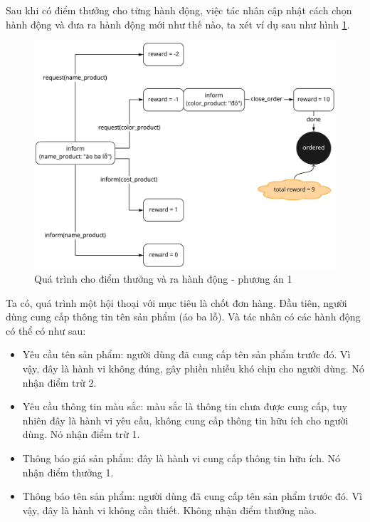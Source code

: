 Sau khi có điểm thưởng cho từng hành động, việc tác nhân cập nhật
cách chọn hành động và đưa ra hành động mới như thế nào, ta xét
ví dụ sau như hình \ref{fig:dialog2}.

\begin{figure}[!ht]
    \centering
    \includegraphics[scale=0.18]{thesis/chatbot/kienthuc/img/dialog_ex13.jpg}
    \caption{Quá trình cho điểm thưởng và ra hành động - phương án 1}
    \label{fig:dialog2}
\end{figure}

Ta có, quá trình một hội thoại với mục tiêu là chốt đơn hàng.
Đầu tiên, người dùng cung cấp thông tin tên sản phẩm (áo ba lỗ).
Và tác nhân có các hành động có thể có như sau:

\begin{itemize}
    \item Yêu cầu tên sản phẩm: người dùng đã cung cấp tên sản phẩm
    trước đó. Vì vậy, đây là hành vi không đúng, gây phiền nhiễu
    khó chịu cho người dùng. Nó nhận điểm trừ 2.
    \item Yêu cầu thông tin màu sắc: màu sắc là thông tin chưa được
    cung cấp, tuy nhiên đây là hành vi yêu cầu, không cung cấp
    thông tin hữu ích cho người dùng. Nó nhận điểm trừ 1.
    \item Thông báo giá sản phẩm: đây là hành vi cung cấp thông tin
    hữu ích. Nó nhận điểm thưởng 1.
    \item Thông báo tên sản phẩm: người dùng đã cung cấp tên sản phẩm
    trước đó. Vì vậy, đây là hành vi không cần thiết. Không nhận
    điểm thưởng nào.
\end{itemize}

